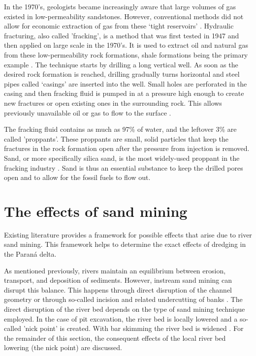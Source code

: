 In the 1970's, geologists became increasingly aware that large volumes of gas existed in low-permeability sandstones. However, conventional methods did not allow for economic extraction of gas from these `tight reservoirs' \autocite{lawGasTightReservoirs1992}. Hydraulic fracturing, also called 'fracking', is a method that was first tested in 1947 and then applied on large scale in the 1970's. It is used to extract oil and natural gas from these low-permeability rock formations, shale formations being the primary example \autocite{denchakFracking1012019}. The technique starts by drilling a long vertical well. As soon as the desired rock formation is reached, drilling gradually turns horizontal and steel pipes called `casings' are inserted into the well. Small holes are perforated in the casing and then fracking fluid is pumped in at a pressure high enough to create new fractures or open existing ones in the surrounding rock. This allows previously unavailable oil or gas to flow to the surface \autocite{denchakFracking1012019}.

The fracking fluid contains as much as 97\% of water, and the leftover 3\% are called 'proppants'. These proppants are small, solid particles that keep the fractures in the rock formation open after the pressure from injection is removed. Sand, or more specifically silica sand, is the most widely-used proppant in the fracking industry \autocite{denchakFracking1012019}. Sand is thus an essential substance to keep the drilled pores open and to allow for the fossil fuels to flow out.


\section{The effects of sand mining}
Existing literature provides a framework for possible effects that arise due to river sand mining. This framework helps to determine the exact effects of dredging in the Paraná delta.

As mentioned previously, rivers maintain an equilibrium between erosion, transport, and deposition of sediments. However, instream sand mining can disrupt this balance. This happens through direct disruption of the channel geometry or through so-called incision and related undercutting of banks \autocite{sand-mining-boek}. The direct disruption of the river bed depends on the type of sand mining technique employed. In the case of pit excavation, the river bed is locally lowered and a so-called 'nick point' is created. With bar skimming the river bed is widened \autocite{sand-mining-boek}. For the remainder of this section, the consequent effects of the local river bed lowering (the nick point) are discussed.

